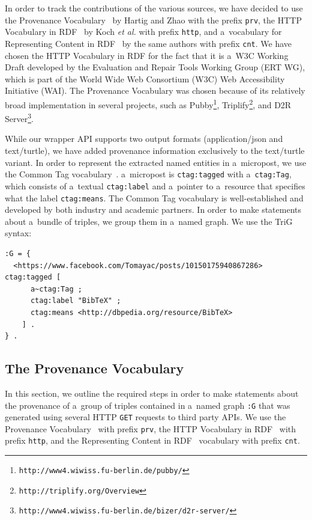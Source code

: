 In order to track the contributions of the various sources, we have decided to use the Provenance Vocabulary~\cite{Hartig:Provenance} by Hartig and Zhao with the prefix \texttt{prv}, the HTTP Vocabulary in RDF~\cite{HTTP:RDF} by Koch \emph{et al.} with prefix \texttt{http}, and a~vocabulary for Representing Content in RDF~\cite{CNT:RDF} by the same authors with prefix \texttt{cnt}. We have chosen the HTTP Vocabulary in RDF for the fact that it is a~W3C Working Draft  developed by the Evaluation and Repair Tools Working Group (ERT WG), which is part of the World Wide Web Consortium (W3C) Web Accessibility Initiative (WAI). The Provenance Vocabulary was chosen because of its relatively broad implementation in several projects, such as Pubby\footnote{\texttt{http://www4.wiwiss.fu-berlin.de/pubby/}}, Triplify\footnote{\texttt{http://triplify.org/Overview}}, and D2R Server\footnote{\texttt{http://www4.wiwiss.fu-berlin.de/bizer/d2r-server/}}.

While our wrapper API supports two output formats (application/json and text/turtle), we have added provenance information exclusively to the text/turtle variant. In order to represent the extracted named entities in a~micropost, we use the Common Tag vocabulary~\cite{CommonTag:Spec}. a~micropost is \texttt{ctag:tagged} with a~\texttt{ctag:Tag}, which consists of a~textual \texttt{ctag:label} and a~pointer to a~resource that specifies what the label \texttt{ctag:means}. The Common Tag vocabulary is well-established and developed by both industry and academic partners. In order to make statements about a~bundle of triples, we group them in a~named graph. We use the TriG~\cite{Bizer:TriG} syntax:

\begin{lstlisting}
:G = {
  <https://www.facebook.com/Tomayac/posts/10150175940867286> ctag:tagged [
      a~ctag:Tag ;
      ctag:label "BibTeX" ;
      ctag:means <http://dbpedia.org/resource/BibTeX>
    ] .
} .
\end{lstlisting}

\subsection{The Provenance Vocabulary}                                      \label{sec:provenance}
In this section, we outline the required steps in order to make statements about the provenance of a~group of triples contained in a~named graph \texttt{:G} that was generated using several HTTP \texttt{GET} requests to third party APIs. We use the Provenance Vocabulary~\cite{Hartig:Provenance} with prefix \texttt{prv}, the HTTP Vocabulary in RDF~\cite{HTTP:RDF} with prefix \texttt{http}, and the Representing Content in RDF~\cite{CNT:RDF} vocabulary with prefix \texttt{cnt}.


